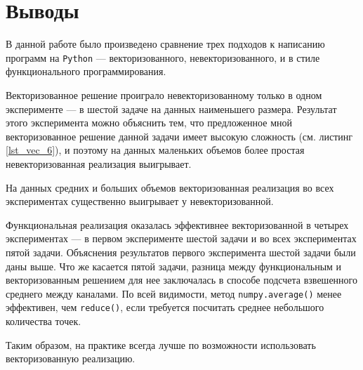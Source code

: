 \documentclass[12pt]{article}
\begin{document}
\pagebreak
\section{Выводы}

\hspace{0.6cm}В данной работе было произведено сравнение трех подходов к написанию программ на \lstinline$Python$ — векторизованного, невекторизованного, и в стиле функционального программирования. %

Векторизованное решение проиграло невекторизованному только в одном эксперименте — в шестой задаче на данных наименьшего размера. Результат этого эксперимента можно объяснить тем, что предложенное мной векторизованное решение данной задачи имеет высокую сложность (см. листинг \ref{lst_vec_6}), и поэтому на данных маленьких объемов более простая невекторизованная реализация выигрывает. 

На данных средних и больших объемов векторизованная реализация во всех экспериментах существенно выигрывает у невекторизованной. 

Функциональная реализация оказалась эффективнее векторизованной в четырех экспериментах — в первом эксперименте шестой задачи и во всех экспериментах пятой задачи. Объяснения результатов первого эксперимента шестой задачи были даны выше. Что же касается пятой задачи, разница между функциональным и векторизованным решением для нее заключалась в способе подсчета взвешенного среднего между каналами. По всей видимости, метод \lstinline$numpy.average()$ менее эффективен, чем \lstinline$reduce()$, если требуется посчитать среднее небольшого количества точек. 

Таким образом, на практике всегда лучше по возможности использовать векторизованную реализацию. 
\end{document}
